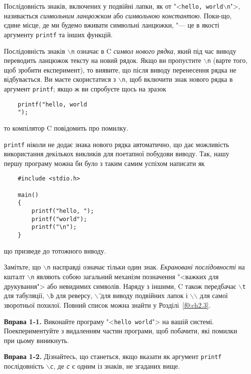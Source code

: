 \documentclass[a4paper,12pt]{book}
\begin{document}
  Послідовність знаків, включених у подвійні лапки, як от "<\texttt{hello,
  world\mbox{$\backslash$}n}">, називається \textit{символьним ланцюжком} або
  \textit{символьною константою}. Поки-що, єдине місце, де ми будемо вживати символьні
  ланцюжки, "--- це в якості аргументу \texttt{printf} та інших функцій.

  Послідовність знаків \texttt{\mbox{$\backslash$}n} означає в C \textit{символ нового
  рядка}, який під час виводу переводить ланцюжок тексту на новий рядок. Якщо ви
  пропустите \texttt{\mbox{$\backslash$}n} (варте того, щоб зробити експеримент), то
  виявите, що після виводу перенесення рядка не відбувається. Ви маєте скористатися з
  \texttt{\mbox{$\backslash$}n}, щоб включити знак нового рядка в аргумент
  \texttt{printf}; якщо ж ви спробуєте щось на зразок
  \begin{verbatim}
    printf("hello, world
    ");
  \end{verbatim}
  то компілятор C повідомить про помилку.

  \texttt{printf} ніколи не додає знака нового рядка автоматично, що дає можливість
  використання декількох викликів для поетапної побудови виводу. Так, нашу першу програму
  можна би було з таким самим успіхом написати як
  \begin{verbatim}
    #include <stdio.h>

    main()
    {
        printf("hello, ");
        printf("world");
        printf("\n");
    }
  \end{verbatim}
  що призведе до тотожного виводу.

  Замітьте, що \texttt{\mbox{$\backslash$}n} насправді означає тільки один знак.
  \textit{Екрановані послідовності} на кшталт \texttt{\mbox{$\backslash$}n} являють собою
  загальний механізм позначення "<важких для друкування"> або невидимих символів. Наряду з
  іншими, C також передбачає \texttt{\mbox{$\backslash$}t} для табуляції,
  \texttt{\mbox{$\backslash$}b} для реверсу, \texttt{\mbox{$\backslash$}\"{}} для виводу
  подвійних лапок і \texttt{\mbox{$\backslash$}\mbox{$\backslash$}} для самої зворотньої
  похилої. Повний список можна знайти у Розділі~\ref{f0:ch2.3}.

  \textbf{Вправа 1-1.} Виконайте програму "<\texttt{hello world}"> на вашій
  системі. Поекпериментуйте з видаленням частин програми, щоб побачити, які помилки при
  цьому виникнуть.

  \textbf{Вправа 1-2.} Дізнайтесь, що станеться, якщо вказати як аргумент \texttt{printf}
  послідовність \texttt{\mbox{$\backslash$}\textit{c}}, де \texttt{\textit{c}} є одним із знаків, не
  згаданих вище.
\end{document}
